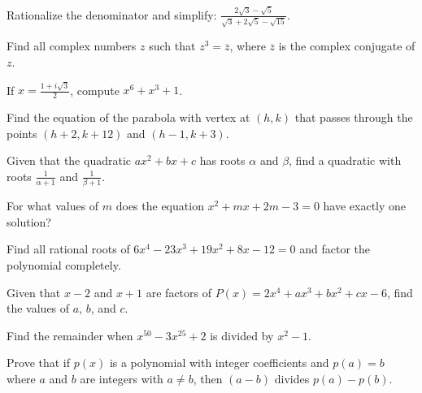 \documentclass[12pt]{exam}
\begin{document}
\begin{questions}
\question[8]
Rationalize the denominator and simplify: $\frac{2\sqrt{3} - \sqrt{5}}{\sqrt{3} + 2\sqrt{5} - \sqrt{15}}$.
\vspace*{6cm}

\question[10]
Find all complex numbers $z$ such that $z^3 = \overline{z}$, where $\overline{z}$ is the complex conjugate of $z$.
\vspace*{6cm}

\question[7]
If $x = \frac{1 + i\sqrt{3}}{2}$, compute $x^6 + x^3 + 1$.
\vspace*{5cm}

\newpage


\question[8]
Find the equation of the parabola with vertex at $(h, k)$ that passes through the points $(h+2, k+12)$ and $(h-1, k+3)$.
\vspace*{6cm}

\question[10]
Given that the quadratic $ax^2 + bx + c$ has roots $\alpha$ and $\beta$, find a quadratic with roots $\frac{1}{\alpha + 1}$ and $\frac{1}{\beta + 1}$.
\vspace*{6cm}

\question[7]
For what values of $m$ does the equation $x^2 + mx + 2m - 3 = 0$ have exactly one solution?
\vspace*{5cm}


\question[8]
Find all rational roots of $6x^4 - 23x^3 + 19x^2 + 8x - 12 = 0$ and factor the polynomial completely.
\vspace*{6cm}

\question[9]
Given that $x - 2$ and $x + 1$ are factors of $P(x) = 2x^4 + ax^3 + bx^2 + cx - 6$, find the values of $a$, $b$, and $c$.
\vspace*{6cm}

\question[8]
Find the remainder when $x^{50} - 3x^{25} + 2$ is divided by $x^2 - 1$.
\vspace*{6cm}

\question[8]
Prove that if $p(x)$ is a polynomial with integer coefficients and $p(a) = b$ where $a$ and $b$ are integers with $a \neq b$, then $(a - b)$ divides $p(a) - p(b)$.
\vspace*{6cm}


\end{questions}
\end{document}
